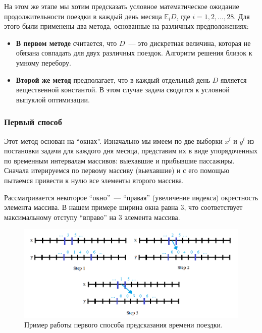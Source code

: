 \documentclass[12pt, fleqn, titlepage]{article}
\begin{document}
    На этом же этапе мы хотим предсказать условное математическое ожидание продолжительности поездки в каждый день месяца $\mathbb{E}_i D$, 
    где $i = 1, 2, \dots, 28$. Для этого были применены два метода, основанные на различных предположениях:
    
    \begin{itemize}
    \item \textbf{В первом методе} считается, что $D$~--- это дискретная величина, которая не обязана 
    совпадать для двух различных поездок. Алгоритм решения близок к умному перебору.
    
    \item \textbf{Второй же метод} предполагает, что в каждый отдельный день $D$ является вещественной константой.
    В этом случае задача сводится к условной выпуклой оптимизации.
    \end{itemize}

    \subsubsection{Первый способ}

    Этот метод основан на “окнах”. Изначально мы имеем по две выборки $x^i$ и $y^i$ из постановки задачи 
    для каждого дня месяца, представим их в виде упорядоченных по 
    временным интервалам массивов: выехавшие и прибывшие пассажиры. Сначала итерируемся по первому массиву 
    (выехавшие) и с его помощью пытаемся привести к нулю все элементы второго массива.
    
    Рассматривается некоторое “окно”~--- “правая” (увеличение индекса) окрестность элемента массива. 
    В нашем примере ширина окна равна $3$, что соответствует максимальному отступу “вправо” на $3$ элемента массива. 

    \begin{figure}[ht]
        \centering
        \includegraphics[scale=0.5]{pics/algo_time1.png}
        \caption{Пример работы первого способа предсказания времени поездки.}
        \label{algo_time1}
    \end{figure}
    
\end{document}
